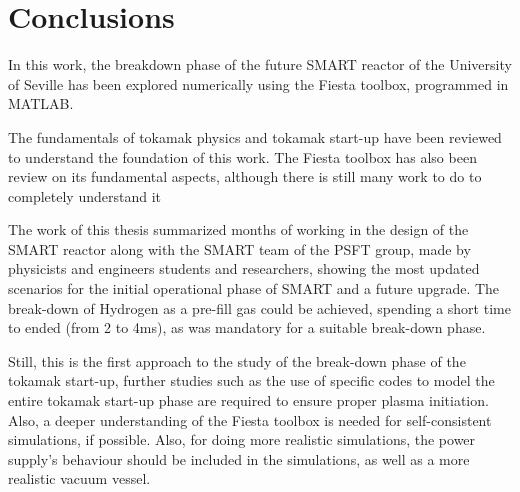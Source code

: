 \documentclass[a4paper,12pt,oneside]{book}
\begin{document}
\chapter{Conclusions}

In this work, the breakdown phase of the future SMART reactor of the University of Seville has been explored numerically using the Fiesta toolbox, programmed in MATLAB.

The fundamentals of tokamak physics and tokamak start-up have been reviewed to understand the foundation of this work. The Fiesta toolbox has also been review on its fundamental aspects, although there is still many work to do to completely understand it

The work of this thesis summarized months of working in the design of the SMART reactor along with the SMART team of the PSFT group, made by physicists and engineers students and researchers, showing the most updated scenarios for the initial operational phase of SMART and a future upgrade. The break-down of Hydrogen as a pre-fill gas could be achieved, spending a short time to ended (from 2 to 4ms), as was mandatory for a suitable break-down phase.

Still, this is the first approach to the study of the break-down phase of the tokamak start-up, further studies such as the use of specific codes to model the entire tokamak start-up phase are required to ensure proper plasma initiation. Also, a deeper understanding of the Fiesta toolbox is needed for self-consistent simulations, if possible. Also, for doing more realistic simulations, the power supply's behaviour should be included in the simulations, as well as a more realistic vacuum vessel.






%




\appendix %



\end{document}
